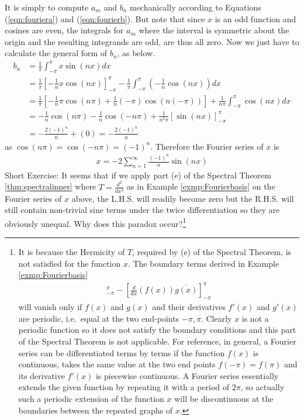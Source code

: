 \begin{solution}
It is simply to compute $a_m$ and $b_n$ mechanically according to Equations (\ref{eqn:fouriera}) and (\ref{eqn:fourierb}). But note that since $x$ is an odd function and cosines are even, the integrals for $a_m$ where the interval is symmetric about the origin and the resulting integrands are odd, are thus all zero. Now we just have to calculate the general form of $b_n$, as below.
\begin{align*}
b_n &= \frac{1}{\pi} \int_{-\pi}^{\pi} x\sin(nx) dx \\
&= \frac{1}{\pi}[-\frac{1}{n}x\cos(nx)]_{-\pi}^{\pi} - \frac{1}{\pi}\int_{-\pi}^{\pi} (-\frac{1}{n}\cos(nx)) dx \\
&= \frac{1}{\pi}[-\frac{1}{n}\pi\cos(n\pi) + \frac{1}{n}(-\pi)\cos(n(-\pi))] + \frac{1}{n\pi}\int_{-\pi}^{\pi} \cos(nx) dx \\
&= -\frac{1}{n}\cos(n\pi) - \frac{1}{n}\cos(-n\pi) + \frac{1}{n^2\pi}[\sin(nx)]_{-\pi}^{\pi} \\
&= -\frac{2(-1)^n}{n} + (0) = -\frac{2(-1)^n}{n}
\end{align*}
as $\cos(n\pi) = \cos(-n\pi) = (-1)^n$. Therefore the Fourier series of $x$ is
\begin{align*}
x = -2 \sum_{n=1}^{\infty} \frac{(-1)^n}{n} \sin(nx)
\end{align*}
Short Exercise: It seems that if we apply part (e) of the Spectral Theorem \ref{thm:spectralinner} where $T = \frac{d^2}{dx^2}$ as in Example \ref{exmp:Fourierbasis} on the Fourier series of $x$ above, the L.H.S. will readily become zero but the R.H.S. will still contain non-trivial sine terms under the twice differentiation so they are obviously unequal. Why does this paradox occur?\footnote{It is because the Hermicity of $T$, required by (e) of the Spectral Theorem, is not satisfied for the function $x$. The boundary terms derived in Example \ref{exmp:Fourierbasis}
\begin{align*}
[f(x) \frac{d}{dx}\overline{([g(x)])}]_{-\pi}^\pi - [\frac{d}{dx}(f(x)) \overline{g(x)}]_{-\pi}^\pi    
\end{align*}
will vanish only if $f(x)$ and $g(x)$ and their derivatives $f'(x)$ and $g'(x)$ are periodic, i.e.\ equal at the two end-points $-\pi, \pi$. Clearly $x$ is not a periodic function so it does not satisfy the boundary conditions and this part of the Spectral Theorem is not applicable. For reference, in general, a Fourier series can be differentiated terms by terms if the function $f(x)$ is continuous, takes the same value at the two end points $f(-\pi) = f(\pi)$ and its derivative $f'(x)$ is piecewise continuous. A Fourier series essentially extends the given function by repeating it with a period of $2\pi$, so actually such a periodic extension of the function $x$ will be discontinuous at the boundaries between the repeated graphs of $x$.}
\end{solution}

